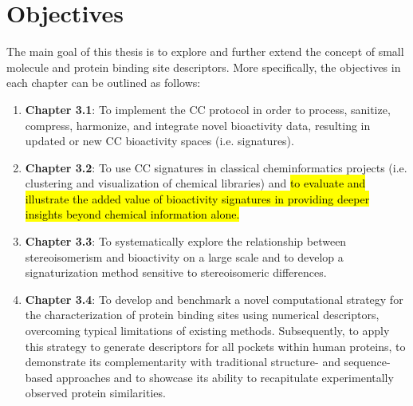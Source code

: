 \chapter{Objectives}
\label{objectives}
\clearpage

The main goal of this thesis is to explore and further extend the concept of small molecule and protein binding site descriptors. More specifically, the objectives in each chapter can be outlined as follows:

\begin{enumerate}

\item \textbf{Chapter 3.1}: To implement the CC protocol in order to process, sanitize, compress, harmonize, and integrate novel bioactivity data, resulting in updated or new CC bioactivity spaces (i.e. signatures). 

\item \textbf{Chapter 3.2}: To use CC signatures in classical cheminformatics projects (i.e. clustering and visualization of chemical libraries) and \hl{to evaluate and illustrate the added value of bioactivity signatures in providing deeper insights beyond chemical information alone.}

\item \textbf{Chapter 3.3}: To systematically explore the relationship between stereoisomerism and bioactivity on a large scale and to develop a signaturization method sensitive to stereoisomeric differences. 

\item \textbf{Chapter 3.4}: To develop and benchmark a novel computational strategy for the characterization of protein binding sites using numerical descriptors, overcoming typical limitations of existing methods. Subsequently, to apply this strategy to generate descriptors for all pockets within human proteins, to demonstrate its complementarity with traditional structure- and sequence-based approaches and to showcase its ability to recapitulate experimentally observed protein similarities.

\end{enumerate}